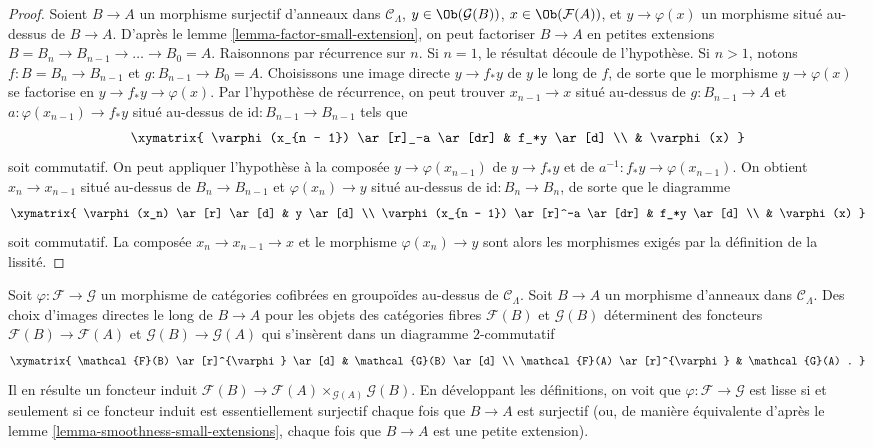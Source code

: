 \begin{proof}
Soient $B \to A$ un morphisme surjectif d'anneaux dans
$\mathcal{C}_\Lambda$, $y \in \Ob(\mathcal{G}(B))$,
$x \in \Ob(\mathcal{F}(A))$, et $y \to \varphi(x)$ un morphisme situé
au-dessus de $B \to A$. D'après le lemme
\ref{lemma-factor-small-extension}, on peut factoriser $B \to A$ en petites
extensions $B = B_n \to B_{n-1} \to \ldots \to B_0 = A$. Raisonnons par
récurrence sur $n$. Si $n = 1$, le résultat découle de l'hypothèse. Si
$n > 1$, notons $f : B = B_n \to B_{n - 1}$ et
$g : B_{n - 1} \to B_0 = A$. Choisissons une image directe $y \to f_* y$
de $y$ le long de $f$, de sorte que le morphisme $y \to \varphi(x)$ se
factorise en $y \to f_* y \to \varphi(x)$. Par l'hypothèse de récurrence, on
peut trouver $x_{n - 1} \to x$ situé au-dessus de
$g : B_{n - 1} \to A$ et $a : \varphi(x_{n - 1}) \to f_*y$ situé au-dessus
de $\text{id} : B_{n - 1} \to B_{n - 1}$ tels que
$$
\xymatrix{
\varphi(x_{n - 1}) \ar[r]_-a \ar[dr] & f_*y \ar[d] \\
& \varphi(x)
}
$$
soit commutatif. On peut appliquer l'hypothèse à la composée
$y \to \varphi(x_{n - 1})$ de $y \to f_*y$ et de
$a^{-1} : f_*y \to \varphi(x_{n - 1})$. On obtient
$x_n \to x_{n - 1}$ situé au-dessus de $B_n \to B_{n - 1}$ et
$\varphi(x_n) \to y$ situé au-dessus de $\text{id} : B_n \to B_n$, de sorte
que le diagramme
$$
\xymatrix{
\varphi(x_n) \ar[r] \ar[d] & y \ar[d] \\
\varphi(x_{n - 1}) \ar[r]^-a \ar[dr] & f_*y \ar[d] \\
& \varphi(x)
}
$$
soit commutatif. La composée $x_n \to x_{n - 1} \to x$ et le morphisme
$\varphi(x_n) \to y$ sont alors les morphismes exigés par la définition de la
lissité.
\end{proof}

\begin{remark}
\label{remark-smoothness-2-categorical}
Soit $\varphi : \mathcal{F} \to \mathcal{G}$ un morphisme de catégories
cofibrées en groupoïdes au-dessus de $\mathcal{C}_\Lambda$. Soit $B \to A$
un morphisme d'anneaux dans $\mathcal{C}_\Lambda$. Des choix d'images directes
le long de $B
\to A$ pour les objets des catégories fibres $\mathcal{F}(B)$
et $\mathcal{G}(B)$ déterminent des foncteurs
$\mathcal{F}(B) \to \mathcal{F}(A)$ et
$\mathcal{G}(B) \to \mathcal{G}(A)$ qui s'insèrent dans un diagramme
$2$-commutatif
$$
\xymatrix{
\mathcal{F}(B) \ar[r]^{\varphi} \ar[d] & \mathcal{G}(B) \ar[d] \\
\mathcal{F}(A) \ar[r]^{\varphi}        & \mathcal{G}(A) .
}
$$
Il en résulte un foncteur induit $\mathcal{F}(B) \to \mathcal{F}(A)
\times_{\mathcal{G}(A)} \mathcal{G}(B)$. En développant les définitions, on
voit que $\varphi : \mathcal{F} \to \mathcal{G}$ est lisse si et seulement
si ce foncteur induit est essentiellement surjectif chaque fois que
$B \to A$ est surjectif (ou, de manière équivalente d'après le lemme
\ref{lemma-smoothness-small-extensions}, chaque fois que $B \to A$ est une
petite extension).
\end{remark}

